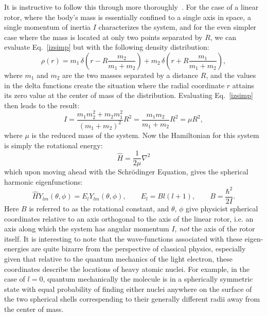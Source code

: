 It is instructive to follow this through more thoroughly~\citep[Sec.~2.8]{Brown2003}.
For the case of a linear rotor, where the body's mass is essentially confined to a single axis in space, a single momentum of inertia $I$ characterizes the system, and for the even simpler case where the mass is located at only two points separated by $R$, we can evaluate Eq.~\ref{izsimp} but with the following density distribution:
\begin{equation}
\rho(r)=m_1\,\delta\!\left(r-R\frac{m_2}{m_1+m_2}\right)+m_2\,\delta\!\left(r+R\frac{m_1}{m_1+m_2}\right),
\end{equation}
where $m_1$ and $m_2$ are the two masses separated by a distance $R$, and the values in the delta functions create the situation where the radial coordinate $r$ attains its zero value at the center of mass of the distribution.
Evaluating Eq.~\ref{izsimp} then leads to the result:
\begin{equation}
I = \frac{m_1m_2^2+m_2m_1^2}{(m_1+m_2)^2}R^2 = \frac{m_1m_2}{m_1+m_2}R^2 = \mu R^2,\label{eqdefI}
\end{equation}
where $\mu$ is the reduced mass of the system.
Now the Hamiltonian for this system is simply the rotational energy:
\begin{equation}
\hat{H} = \frac{1}{2\mu}\nabla^2
\end{equation}
which upon moving ahead with the Schr\"{o}dinger Equation, gives the spherical harmonic eigenfunctions:
\begin{equation}
\hat{H}Y_{lm}(\theta,\phi) = E_lY_{lm}(\theta,\phi),\qquad E_l = Bl(l+1),\qquad B=\frac{\hbar^2}{2I}.\label{eqdefb}
\end{equation}
Here $B$ is referred to as the rotational constant, and $\theta$, $\phi$ give physicist spherical coordinates relative to an axis orthogonal to the axis of the linear rotor, i.e. an axis along which the system has angular momentum $I$, \emph{not} the axis of the rotor itself.
It is interesting to note that the wave-functions associated with these eigen-energies are quite bizarre from the perspective of classical physics, especially given that relative to the quantum mechanics of the light electron, these coordinates describe the locations of heavy atomic nuclei.
For example, in the case of $l=0$, quantum mechanically the molecule is in a spherically symmetric state with equal probability of finding either nuclei anywhere on the surface of the two spherical shells correspending to their generally different radii away from the center of mass.

